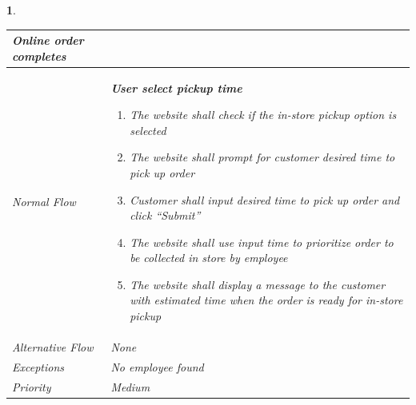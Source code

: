 \documentclass{scrreprt}
\theoremstyle{funreq}
\newtheorem{funreq}{}
\begin{document}
\begin{funreq}
\begin{table}[H]
{\begin{tabularx}{\columnwidth}{|l|X|}
					Online order completes
					\\ \hline Normal Flow &
					\bfseries{User select pickup time}\normalfont\newline 
					\begin{enumerate}
					    \item The website shall check if the in-store pickup option is selected
					    \item The website shall prompt for customer desired time to pick up order
                        \item Customer shall input desired time to pick up order and click “Submit”
                        \item The website shall use input time to prioritize order to be collected in store by employee
                        \item The website shall display a message to the customer with estimated time when the order is ready for in-store pickup
					\end{enumerate}
					\\ \hline Alternative Flow & 
					None
					\\ \hline Exceptions & 
					No employee found
					\\ \hline Priority & 
					Medium
					\\ \hline
				\end{tabularx}%
			}
		\end{table}
	\end{funreq}


\end{document}
